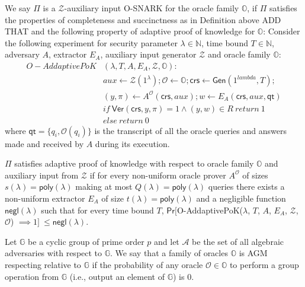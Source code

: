 \begin{definition}[O-SNARKs]
\label{def:osnarks}
We say $\Pi$ is a $\mathcal{Z}$-auxiliary input O-SNARK for the oracle family $\mathbb{O}$, 
if $\Pi$ satisfies the properties of completeness and 
succinctness as in Definition above {\color{red} ADD THAT} 
and the following property of adaptive proof of knowledge for $\mathbb{O}$:
Consider the following experiment for security parameter $\lambda \in \mathbb{N}$, 
time bound $T \in \mathbb{N}$, adversary $A$, extractor $E_A$, 
auxiliary input generator $\mathcal{Z}$ and oracle family $\mathbb{O}$:\\

\begin{align*}
O-AddaptivePoK&(\lambda, T, A, E_A, \mathcal{Z}, \mathbb{O}): \\
& \mathit{aux} \leftarrow \mathcal{Z}(1^{\lambda}); \mathcal{O} \leftarrow \mathbb{O}; \mathsf{crs} \leftarrow \mathsf{Gen}(1^{lambda},T); \\
& (y,\pi) \leftarrow A^{\mathcal{O}}(\mathsf{crs},\mathit{aux}); w \leftarrow E_A(\mathsf{crs}, \mathit{aux}, \mathsf{qt}) \\
& if \ \mathsf{Ver}(\mathsf{crs}, y, \pi) = 1 \wedge (y,w) \in R \ return  \ 1 \\
& else \ return \ 0
\end{align*}
\noindent where $\mathsf{qt} = \{q_i, \mathcal{O}(q_i)\}$ is the transcript of all the oracle queries and answers made and received by $A$ during its execution. 

$\Pi$ satisfies adaptive proof of knowledge with respect to oracle family  $\mathbb{O}$ and auxiliary input from $\mathcal{Z}$ 
if for every non-uniform oracle prover $A^{\mathcal{O}}$ of sizes $s(\lambda)= \mathsf{poly}(\lambda)$ making at most 
$Q(\lambda) = \mathsf{poly}(\lambda)$ queries there exists a non-uniform extractor
$E_A$ of size $t(\lambda)=\mathsf{poly}(\lambda)$ and a negligible function $\mathsf{negl}(\lambda)$ 
such that for every time bound $T$, 
$\mathsf{Pr}[$O-AddaptivePoK($\lambda$, $T$, $A$, $E_A$, $\mathcal{Z}$, $\mathcal{O}$) $ \implies  1]\ \leq \mathsf{negl}(\lambda)$. 
\end{definition} 


\begin{definition}
\label{def:agm_oracles}
Let $\mathbb{G}$ be a cyclic group of prime order $p$ and let $\mathcal{A}$ be the set of all algebraic adversaries with 
respect to $\mathbb{G}$. We say that a family of oracles $\mathbb{O}$ is AGM respecting relative to $\mathbb{G}$ if 
the probability of any oracle $\mathcal{O} \in \mathbb{O}$ to perform a group operation from $\mathbb{G}$ 
(i.e., output an element of $\mathbb{G}$) is $0$. 
\end{definition}


